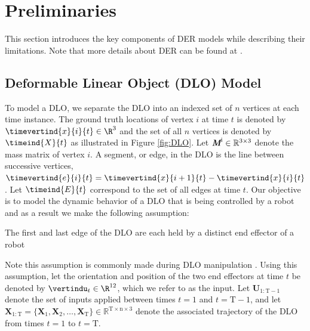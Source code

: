 \section{Preliminaries}
\label{Appendix: DER}
This section introduces the key components of DER models while describing their limitations.
Note that more details about DER can be found at \cite{originalDER}. %
 \subsection{Deformable Linear Object (DLO) Model}
To model a DLO, we separate the DLO into an indexed set of $n$ vertices at each time instance. 
The ground truth locations of vertex $i$ at time $t$ is denoted by $\timevertind{x}{i}{t} \in \R^3$ and the set of all $n$ vertices is denoted by $\timeind{X}{t}$ as illustrated in Figure \ref{fig:DLO}. 
Let $\textit{\textbf{M}}^\text{i}\in \mathbb{R}^{3\times3}$ denote the mass matrix of vertex $i$.
A segment, or edge, in the DLO is the line between successive vertices, $\timevertind{e}{i}{t} = \timevertind{x}{i+1}{t} - \timevertind{x}{i}{t}$.
Let $\timeind{E}{t}$ correspond to the set of all edges at time $t$.
Our objective is to model the dynamic behavior of a DLO that is being controlled by a robot and as a result we make the following assumption:
\begin{assum}
    The first and last edge of the DLO are each held by a distinct end effector of a robot 
    \label{assum:grasp condition}
\end{assum}
Note this assumption is commonly made during DLO manipulation \cite{IRP, diminishingridgidity, directionalrigidity, inlstm, gelsim}. Using this assumption, let the orientation and position of the two end effectors at time $t$ be denoted by $\vertindu_t \in \R^{12}$, which we refer to as the input.
Let $\textbf{U}_{1:\text{T}-1}$ denote the set of inputs applied between times $t=1$ and $t=\text{T}-1$, and let $\textbf{X}_{1:\text{T}} =\{\textbf{X}_1, \textbf{X}_2,\ldots, \textbf{X}_\text{T}\} \in \mathbb{R}^{\text{T} \times \text{n}\times 3}$ denote the associated trajectory of the DLO from times $t=1$ to $t=\text{T}$.

